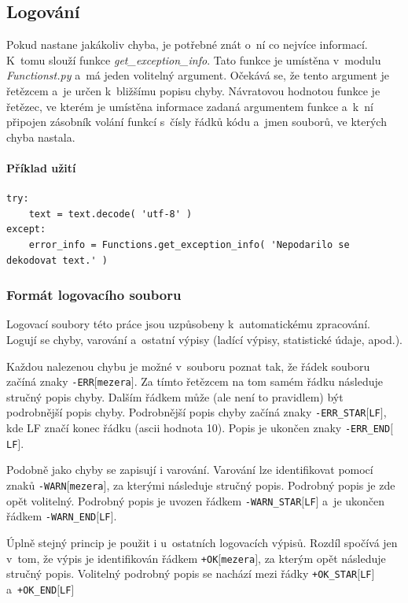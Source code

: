 \subsection{Logování}
Pokud nastane jakákoliv chyba, je potřebné znát o~ní co nejvíce informací. K~tomu
slouží funkce \textit{get\_exception\_info}. Tato funkce je umístěna v~modulu \textit{Functionst.py}
a~má jeden volitelný argument. Očekává se, že tento argument je řetězcem a~je určen k~bližšímu
popisu chyby. Návratovou hodnotou funkce je řetězec, ve kterém je umístěna informace zadaná
argumentem funkce a~k~ní připojen zásobník volání funkcí s~čísly řádků kódu a~jmen souborů,
ve kterých chyba nastala.

\paragraph{Příklad užití}
\begin{lstlisting}
try:
    text = text.decode( 'utf-8' )
except:
    error_info = Functions.get_exception_info( 'Nepodarilo se dekodovat text.' )
\end{lstlisting}

\subsubsection{Formát logovacího souboru}
Logovací soubory této práce jsou uzpůsobeny k~automatickému zpracování. Logují se
chyby, varování a~ostatní výpisy (ladící výpisy, statistické údaje, apod.).

Každou nalezenou chybu je možné v~souboru poznat tak, že řádek souboru
začíná znaky \texttt{-ERR$[$mezera$]$}. Za tímto řetězcem na tom samém řádku následuje
stručný popis chyby. Dalším řádkem může (ale není to pravidlem) být podrobnější popis chyby.
Podrobnější popis chyby začíná znaky \texttt{-ERR\_STAR$[$LF$]$}, kde LF značí konec řádku (ascii hodnota 10).
Popis je ukončen znaky \texttt{-ERR\_END$[$LF$]$}.

Podobně jako chyby se zapisují i varování. Varování lze identifikovat pomocí znaků \texttt{-WARN$[$mezera$]$},
za kterými následuje stručný popis. Podrobný popis je zde opět volitelný. Podrobný popis je uvozen řádkem
\texttt{-WARN\_STAR$[$LF$]$} a~je ukončen řádkem \texttt{-WARN\_END$[$LF$]$}.

Úplně stejný princip je použit i u~ostatních logovacích výpisů. Rozdíl spočívá jen v~tom, že
výpis je identifikován řádkem \texttt{+OK$[$mezera$]$}, za kterým opět následuje stručný popis.
Volitelný podrobný popis se nachází mezi řádky \texttt{+OK\_STAR$[$LF$]$} a~\texttt{+OK\_END$[$LF$]$}

